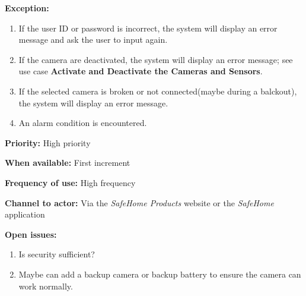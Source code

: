 \documentclass[twoside,11pt]{article}
\begin{document}
\begin{center}
{{\begin{multicols}{2}
                \textbf{Exception:}

                \begin{enumerate}
                    \item If the user ID or password is incorrect, the system will display an error message and ask the user to input again.
                    \item If the camera are deactivated, the system will display an error message; see use case \textbf{Activate and Deactivate the Cameras and Sensors}.
                    \item If the selected camera is broken or not connected(maybe during a balckout), the system will display an error message.
                    \item An alarm condition is encountered.
                \end{enumerate}

                \textbf{Priority:} High priority

                \textbf{When available:} First increment

                \textbf{Frequency of use:} High frequency

                \textbf{Channel to actor:} Via the \emph{SafeHome Products} website or the \emph{SafeHome} application

                \textbf{Open issues:}

                \begin{enumerate}
                    \item Is security sufficient?
                    \item Maybe can add a backup camera or backup battery to ensure the camera can work normally.
                \end{enumerate}

            \end{multicols}}}
\end{center}
\newpage
\end{document}
